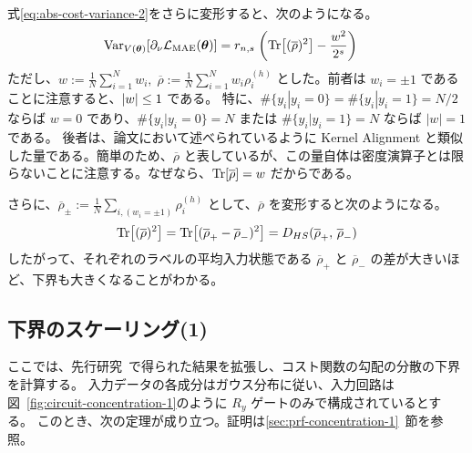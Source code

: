 式\eqref{eq:abs-cost-variance-2}をさらに変形すると、次のようになる。
\begin{align}
    \operatorname{Var}_{V(\boldsymbol{\theta})}[\partial_\nu\mathcal{L}_{\mathrm{MAE}}(\boldsymbol{\theta})]
    &=
    r_{n,s}\;
    \qty(\Tr[(\overline{\rho})^2] - \frac{w^2}{2^s}) \label{eq:abs-cost-variance-3}
\end{align}
ただし、$w := \frac1N\sum_{i=1}^N w_i,\; \overline{\rho} := \frac{1}{N}\sum_{i=1}^N w_i\rho_i^{(h)}$ とした。前者は $w_i = \pm1$ であることに注意すると、$\abs{w} \leq 1$ である。
特に、$\#\{y_i|y_i=0\} = \#\{y_i|y_i=1\} = N/2$ ならば $w = 0$ であり、$\#\{y_i|y_i=0\} = N$ または $\#\{y_i|y_i=1\} = N$ ならば $|w| = 1$ である。
後者は、論文\cite{hubregtsen2022training}において述べられているように Kernel Alignment と類似した量である。簡単のため、$\overline{\rho}$ と表しているが、この量自体は密度演算子とは限らないことに注意する。なぜなら、$\Tr[\overline{\rho}] = w$ だからである。


さらに、$\overline{\rho}_\pm := \frac{1}{N}\sum\limits_{i,(w_i=\pm1)} \rho_i^{(h)}$ として、$\overline{\rho}$ を変形すると次のようになる。
\begin{align}
    \Tr[(\overline{\rho})^2]
    =  \Tr[(\overline{\rho}_+ - \overline{\rho}_-)^2]
    = D_{HS}(\overline{\rho}_+,\, \overline{\rho}_-)
\end{align}
したがって、それぞれのラベルの平均入力状態である $\overline{\rho}_+$ と $\overline{\rho}_-$ の差が大きいほど、下界も大きくなることがわかる。



\subsection{下界のスケーリング(1)}\label{sec:lower-bound-1}
ここでは、先行研究~\cite{li2022concentration}で得られた結果を拡張し、コスト関数の勾配の分散の下界を計算する。
入力データの各成分はガウス分布に従い、入力回路は図~\ref{fig:circuit-concentration-1}のように $R_y$ ゲートのみで構成されているとする。
このとき、次の定理が成り立つ。証明は\ref{sec:prf-concentration-1}~節を参照。

